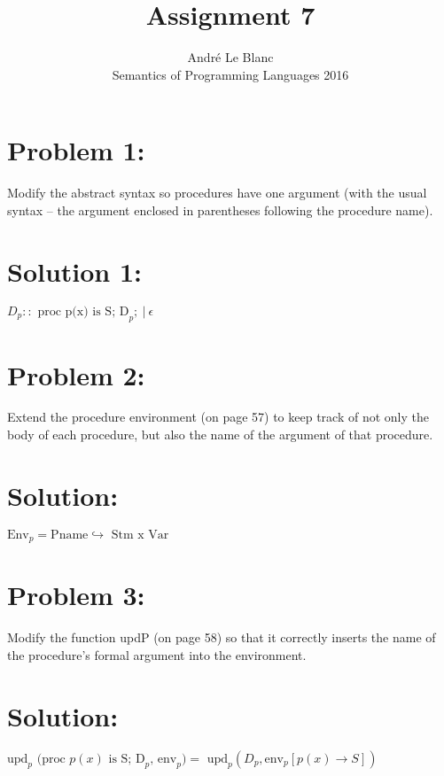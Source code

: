 \documentclass[10pt]{article}
\begin{document}
\title{Assignment 7}
\author{André Le Blanc\\
Semantics of Programming Languages 2016}
\maketitle
\large

\section*{Problem 1:}

Modify the abstract syntax so procedures have one argument (with the usual syntax – the argument enclosed in parentheses following the procedure name).

\section*{Solution 1:}

$D_p :: \text{ proc p(x) is S; D}_p; \  | \ \epsilon$

\section*{Problem 2:}

Extend the procedure environment (on page 57) to keep track of not only the body of each procedure, but also the name of the argument of that procedure.

\section*{Solution:}

$\text{Env}_p = \text{Pname} \hookrightarrow \text{ Stm x  Var} $


\section*{Problem 3:}

Modify the function updP (on page 58) so that it correctly inserts the name of the procedure's formal argument into the environment.

\section*{Solution:}

$\text{upd}_p \text{ (proc } p(x) \text{ is S; D}_p \text{, env}_p) = \text{ upd}_p (D_p, \text{env}_p [p(x) \rightarrow S])$
\end{document}
